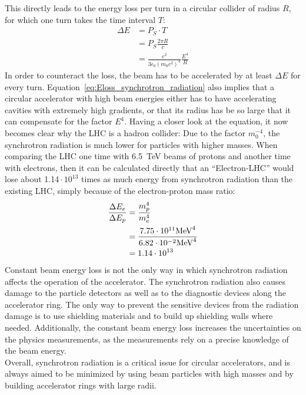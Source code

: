 This directly leads to the energy loss per turn in a circular collider of radius $R$, for which one turn takes the time interval $T$:
\begin{align}
 \Delta E &= P_S\cdot T\\
 &= P_S\frac{2\pi R}{c}\\
 &=\frac{e^2}{3\epsilon_0(m_0c^2)^4}\frac{E^4}{R} \label{eq:Eloss_synchrotron_radiation}
\end{align}
In order to counteract the loss, the beam has to be accelerated by at least $\Delta E$ for every turn.
Equation~\ref{eq:Eloss_synchrotron_radiation} also implies that a circular accelerator with high beam energies either has to have accelerating cavities with extremely high gradients, or that its radius has be so large that it can compensate for the factor $E^4$.
Having a closer look at the equation, it now becomes clear why the LHC is a hadron collider:
Due to the factor $m_0^{-4}$, the synchrotron radiation is much lower for particles with higher masses.
When comparing the LHC one time with \SI{6.5}{\TeV} beams of protons and another time with electrons, then it can be calculated directly that an ``Electron-LHC'' would lose about 1.14\,$\cdot\,10^{13}$ times as much energy from synchrotron radiation than the existing LHC, simply because of the electron-proton mass ratio:
\begin{align*}
 \frac{\Delta E_e}{\Delta E_p} &=\frac{m_p^4}{m_e^4}\\
 &= \frac{7.75\cdot10^{11} \textnormal{MeV}^4}{6.82\cdot10^{-2} \textnormal{MeV}^4}\\
 &=1.14\cdot10^{13}
\end{align*}
Constant beam energy loss is not the only way in which synchrotron radiation affects the operation of the accelerator.
The synchrotron radiation also causes damage to the particle detectors as well as to the diagnostic devices along the accelerator ring.
The only way to prevent the sensitive devices from the radiation damage is to use shielding materials and to build up shielding walls where needed.
Additionally, the constant beam energy loss increases the uncertainties on the physics measurements, as the measurements rely on a precise knowledge of the beam energy.
\\
Overall, synchrotron radiation is a critical issue for circular accelerators, and is always aimed to be minimized by using beam particles with high masses and by building accelerator rings with large radii.

